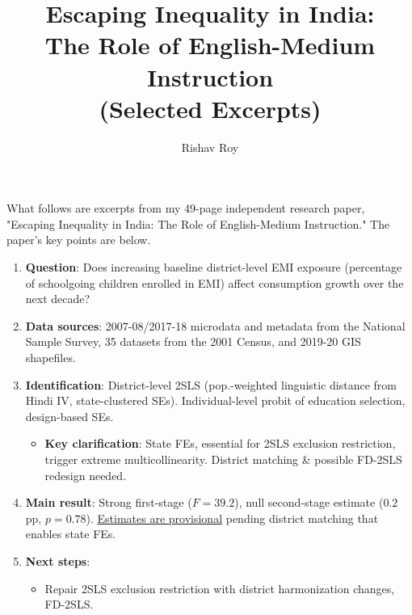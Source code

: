 \documentclass[letterpaper,12pt]{article}
\title{Escaping Inequality in India: \\ The Role of English-Medium Instruction \\ \large{(Selected Excerpts)}}
\author{Rishav Roy}
\date{}
\begin{document}
\maketitle
\vspace{-6mm}
\noindent What follows are excerpts from my 49-page independent research paper, "Escaping Inequality in India: The Role of English-Medium Instruction." The paper's key points are below.

\begin{enumerate}

\item \textbf{Question}: Does increasing baseline district-level EMI exposure (percentage of schoolgoing children enrolled in EMI) affect consumption growth over the next decade? 

\item \textbf{Data sources}: 2007-08/2017-18 microdata and metadata from the National Sample Survey, 35 datasets from the 2001 Census, and 2019-20 GIS shapefiles.

\item \textbf{Identification}: District-level 2SLS (pop.-weighted linguistic distance from Hindi IV, state-clustered SEs). Individual-level probit of  education selection, design-based SEs. 
\vspace{-3mm}
\begin{itemize}
\item \textbf{Key clarification}: State FEs, essential for 2SLS exclusion restriction, trigger extreme multicollinearity. District matching \& possible FD-2SLS redesign needed.
\end{itemize}
\vspace{-2mm}

\item \textbf{Main result}: Strong first-stage ($F=39.2$), null second-stage estimate ($0.2$ pp, $p=0.78$). \underline{Estimates are provisional} pending district matching that enables state FEs.

\item \textbf{Next steps}: 
\vspace{-3mm}
\begin{itemize}
\item Repair 2SLS exclusion restriction with district harmonization changes, FD-2SLS.


\end{itemize}
\end{enumerate}
\end{document}
